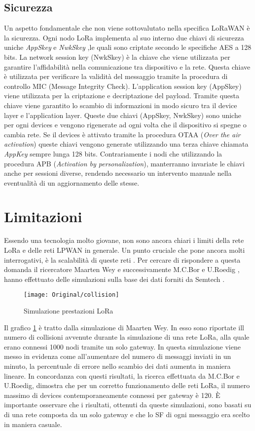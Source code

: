 \subsection{Sicurezza }
Un aspetto fondamentale che non viene sottovalutato nella specifica LoRaWAN è la
sicurezza. Ogni nodo LoRa implementa al suo interno due chiavi di sicurezza
uniche \emph{AppSkey} e \emph{NwkSkey} ,le quali sono criptate secondo le
specifiche AES a 128 bits.
La network session key (NwkSkey) è la chiave che viene utilizzata per garantire
l'affidabilità nella comunicazione tra dispositivo e la rete. Questa chiave
 è utilizzata per verificare la validità del messaggio tramite la
procedura di controllo MIC (Message Integrity Check). 
L'application session key (AppSkey) viene utilizzata per la criptazione e
decriptazione del payload. Tramite questa chiave viene garantito lo scambio di informazioni 
in modo sicuro tra il device layer e l'application layer. 
Queste due chiavi (AppSkey, NwkSkey) sono uniche per ogni devices e vengono
rigenerate ad ogni volta che il dispositivo si spegne o cambia rete. 
Se il devices è attivato tramite
la procedura OTAA (\emph{Over the air activation}) queste chiavi vengono
generate utilizzando una terza chiave chiamata \emph{AppKey} sempre lunga
128 bits. Contrariamente i nodi che utilizzando la procedura APB
(\emph{Activation by personalization}), manterranno invariate le chiavi anche per
sessioni diverse, rendendo necessario un intervento manuale nella eventualità di
un aggiornamento delle stesse.


\section{Limitazioni}
Essendo una tecnologia molto giovane, non sono ancora chiari i limiti della
rete LoRa e delle reti LPWAN in generale. 
Un punto cruciale che pone ancora molti interrogativi, è la scalabilità di
queste reti . Per cercare di rispondere a questa domanda il ricercatore Maarten
Wey \cite{Weyn} e
successivamente M.C.Bor e U.Roedig \cite{Bor}, hanno effettuato delle simulazioni sulla
base dei dati forniti da Semtech .
\begin{figure}[ht]
        \centering 
                \texttt{[image: Original/collision]}
        \caption{Simulazione prestazioni LoRa}
        \label{fig:collision}
\end{figure}
Il grafico \ref{fig:collision} è tratto dalla simulazione di Maarten
Wey. In esso sono riportate ill numero di collisioni
avvenute durante la simulazione di una rete LoRa, alla quale erano connessi 1000
nodi tramite un solo gateway. In questa simulazione viene messo in evidenza
come all'aumentare del numero di messaggi inviati in un minuto, la percentuale
di errore nello scambio dei dati aumenta in maniera lineare.
In concordanza con questi risultati, la ricerca effettuata
da M.C.Bor e U.Roedig, dimostra che  per un corretto funzionamento delle reti
LoRa, il numero massimo di devices contemporaneamente connessi per gateway è 120.
È importante osservare che i risultati,
ottenuti da queste simulazioni, sono basati su di una rete composta da un solo
gateway e che lo SF di ogni messaggio era scelto in maniera casuale. 

